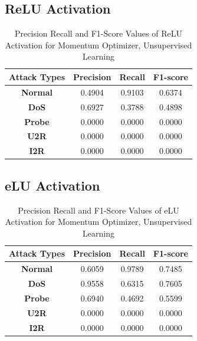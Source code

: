 \documentclass[12pt, a4paper]{report}
\begin{document}
\begin{appendices}
  
  \subsection{ReLU Activation}
  \begin{table}[ht]
		\centering
		\captionsetup{justification=centering,margin=2cm}
		\begin{tabular}{|c|c|c|c|}
		\hline
		\textbf{Attack Types} & \textbf{Precision} & \textbf{Recall} & \textbf{F1-score} \\ \hline
		\textbf{Normal}       & 0.4904             & 0.9103          & 0.6374            \\ \hline
		\textbf{DoS}          & 0.6927             & 0.3788          & 0.4898            \\ \hline
		\textbf{Probe}        & 0.0000             & 0.0000          & 0.0000            \\ \hline
		\textbf{U2R}          & 0.0000             & 0.0000          & 0.0000            \\ \hline
		\textbf{I2R}          & 0.0000             & 0.0000          & 0.0000            \\ \hline
		\end{tabular}
		\caption{Precision Recall and F1-Score Values of ReLU Activation for Momentum Optimizer, Unsupervised Learning}
		\label{classification ReLU sgd tf}
		\end{table} 
\clearpage
   \subsection{eLU Activation}
  \begin{table}[h]
		\centering
		\captionsetup{justification=centering,margin=2cm}
		\begin{tabular}{|c|c|c|c|}
		\hline
		\textbf{Attack Types} & \textbf{Precision} & \textbf{Recall} & \textbf{F1-score} \\ \hline
		\textbf{Normal}       & 0.6059             & 0.9789          & 0.7485            \\ \hline
		\textbf{DoS}          & 0.9558             & 0.6315          & 0.7605            \\ \hline
		\textbf{Probe}        & 0.6940             & 0.4692          & 0.5599            \\ \hline
		\textbf{U2R}          & 0.0000             & 0.0000          & 0.0000            \\ \hline
		\textbf{I2R}          & 0.0000             & 0.0000          & 0.0000            \\ \hline
		\end{tabular}
		\caption{Precision Recall and F1-Score Values of eLU Activation for Momentum Optimizer, Unsupervised Learning}
		\label{classification eLU sgd tf}
		\end{table} 


\end{appendices}
\end{document}
